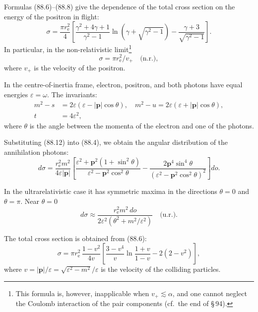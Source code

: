 Formulas (88.6)--(88.8) give the dependence of the total cross section on the energy of the positron in flight:
\begin{equation}
\sigma = \frac{\pi r_\mathrm{e}^2}{4}\left[\frac{\gamma^2 + 4\gamma + 1}{\gamma^2 - 1}\ln(\gamma + \sqrt{\gamma^2 - 1}) - \frac{\gamma + 3}{\sqrt{\gamma^2 - 1}}\right].
\label{eq:88.10}
\end{equation}
In particular, in the non-relativistic limit\footnote{This formula is, however, inapplicable when $v_+ \lesssim \alpha$, and one cannot neglect the Coulomb interaction of the pair components (cf.\ the end of \S\,94).}
\begin{equation}
\sigma = \pi r_\mathrm{e}^2/v_+ \quad \text{(n.r.)},
\label{eq:88.11}
\end{equation}
where $v_+$ is the velocity of the positron.

In the centre-of-inertia frame, electron, positron, and both photons have equal energies $\varepsilon = \omega$. The invariants:
\begin{equation}
\begin{aligned}
m^2 - s &= 2\varepsilon(\varepsilon - |\mathbf{p}|\cos\theta), \quad m^2 - u = 2\varepsilon(\varepsilon + |\mathbf{p}|\cos\theta), \\
t &= 4\varepsilon^2,
\end{aligned}
\label{eq:88.12}
\end{equation}
where $\theta$ is the angle between the momenta of the electron and one of the photons.


Substituting (88.12) into (88.4), we obtain the angular distribution of the annihilation photons:
\begin{equation}
d\sigma = \frac{r_\mathrm{e}^2 m^2}{4\varepsilon|\mathbf{p}|}\left[\frac{\varepsilon^2 + \mathbf{p}^2(1 + \sin^2\theta)}{\varepsilon^2 - \mathbf{p}^2\cos^2\theta} - \frac{2\mathbf{p}^4\sin^4\theta}{(\varepsilon^2 - \mathbf{p}^2\cos^2\theta)^2}\right]do.
\label{eq:88.13}
\end{equation}

In the ultrarelativistic case it has symmetric maxima in the directions $\theta = 0$ and $\theta = \pi$. Near $\theta = 0$
\begin{equation}
d\sigma \approx \frac{r_\mathrm{e}^2 m^2\,do}{2\varepsilon^2(\theta^2 + m^2/\varepsilon^2)}\quad\text{(u.r.)}.
\label{eq:88.14}
\end{equation}

The total cross section is obtained from (88.6):
\begin{equation}
\sigma = \pi r_\mathrm{e}^2\,\frac{1 - v^2}{4v}\left[\frac{3 - v^4}{v}\ln\frac{1+v}{1-v} - 2(2 - v^2)\right],
\label{eq:88.15}
\end{equation}
where $v = |\mathbf{p}|/\varepsilon = \sqrt{\varepsilon^2 - m^2}/\varepsilon$ is the velocity of the colliding particles.

